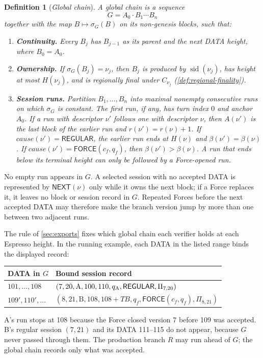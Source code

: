 \documentclass[11pt,a4paper]{article}
\newcommand{\TB}{\mathit{TB}}
\newcommand{\tagg}[1]{\ensuremath{\mathsf{#1}}}
\newcommand{\defterm}[1]{\textcolor{rrBlue}{\textit{#1}}}
\newtheorem{definition}{Definition}[section]
\begin{document}
\begin{definition}[\defterm{Global chain}]
\label{def:global-chain}
A global chain is a sequence
\[
 G=A_0\cdot B_1\cdots B_n
\]
together with the map $B\mapsto\sigma_G(B)$ on its non-genesis blocks,
such that:
\begin{enumerate}[label=(\roman*),itemsep=2pt]
\item \textbf{Continuity.} Every $B_j$ has $B_{j-1}$ as its parent and
the next DATA height, where $B_0=A_0$.
\item \textbf{Ownership.} If $\sigma_G(B_j)=\nu_j$, then $B_j$ is
produced by $\operatorname{sid}(\nu_j)$, has height at most $H(\nu_j)$,
and is regionally final under $C_{\nu_j}$
(\cref{def:regional-finality}).
\item \textbf{Session runs.} Partition $B_1,\ldots,B_n$ into maximal
nonempty consecutive runs on which $\sigma_G$ is constant.  The first
run, if any, has turn index $0$ and anchor $A_0$.  If a run with
descriptor $\nu'$ follows one with descriptor $\nu$, then
$A(\nu')$ is the last block of the earlier run and
$r(\nu')=r(\nu)+1$.  If
$\mathit{cause}(\nu')=\tagg{REGULAR}$, the earlier run ends at
$H(\nu)$ and $\beta(\nu')=\beta(\nu)$.  If
$\mathit{cause}(\nu')=\tagg{FORCE}(c_f,q_f)$, then
$\beta(\nu')>\beta(\nu)$.  A run that ends below its terminal height can
only be followed by a Force-opened run.
\end{enumerate}
\end{definition}
No empty run appears in $G$.  A selected session with no accepted DATA
is represented by $\tagg{NEXT}(\nu)$ only while it owns the next block;
if a Force replaces it, it leaves no block or session record in $G$.
Repeated Forces before the next accepted DATA may therefore make the
branch version jump by more than one between two adjacent runs.

The rule of \cref{sec:exports} fixes which global chain each verifier
holds at each Espresso height. In the running example, each DATA in the
listed range binds the displayed record:
\begin{center}\small
\begin{tabular}{@{}ll@{}}\toprule
DATA in $G$ & Bound session record\\\midrule
$101,\ldots,108$ & $(7,20,\text{A},100,110,q_{\rm A},\tagg{REGULAR},\Pi_{7,20})$\\
$109',110',\ldots$ & $(8,21,\text{B},108,108+\TB,q_f,\tagg{FORCE}(c_f,q_f),\Pi_{8,21})$\\\bottomrule
\end{tabular}
\end{center}
A's run stops at 108 because the Force closed version 7 before 109
was accepted. B's regular session $(7,21)$ and its DATA 111--115 do not
appear, because $G$ never passed through them. The production branch
$R$ may run ahead of $G$; the global chain records only what was
accepted.
\end{document}
